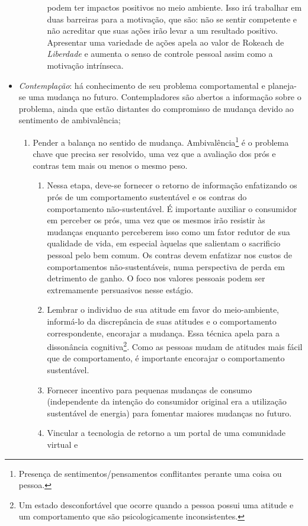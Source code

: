 \begin{itemize}
\begin{enumerate}
\begin{enumerate}
podem ter impactos positivos no meio ambiente. Isso irá trabalhar em duas
barreiras para a motivação, que são: não se sentir competente e não acreditar
que suas ações irão levar a um resultado positivo. Apresentar uma variedade de
ações apela ao valor de Rokeach de \emph{Liberdade} e aumenta o senso de
controle pessoal assim como a motivação intrínseca.
\end{enumerate}
\end{enumerate}
\item \emph{Contemplação}: há conhecimento de seu problema comportamental e
planeja-se uma mudança no futuro. Contempladores são abertos a informação sobre
o problema, ainda que estão distantes do compromisso de mudança devido ao
sentimento de ambivalência;
\begin{enumerate}
\item Pender a balança no sentido de mudança. Ambivalência\footnote{Presença de
sentimentos/pensamentos conflitantes perante uma coisa ou pessoa.} é o problema chave
que precisa ser resolvido, uma vez que a avaliação dos prós e contras tem mais
ou menos o mesmo peso.
\begin{enumerate}
\item Nessa etapa, deve-se fornecer o retorno de informação enfatizando os prós de um
comportamento sustentável e os contras do comportamento não-sustentável. É
importante auxiliar o consumidor em perceber os prós, uma vez que os mesmos irão
resistir às mudanças enquanto perceberem isso como um fator redutor de sua
qualidade de vida, em especial àquelas que salientam o sacrificio pessoal pelo
bem comum. Os contras devem enfatizar nos custos de comportamentos
não-sustentáveis, numa perspectiva de perda em detrimento de ganho. O foco nos
valores pessoais podem ser extremamente persuasivos nesse estágio.
\item Lembrar o individuo de sua atitude em favor do meio-ambiente, informá-lo
da discrepância de suas atitudes e o comportamento correspondente, encorajar a
mudança. Essa técnica apela para a dissonância cognitiva\footnote{Um estado
desconfortável que ocorre quando a pessoa possui uma atitude e um comportamento
que são psicologicamente inconsistentes.}. Como as pessoas mudam de atitudes mais
fácil que de comportamento, é importante encorajar o comportamento sustentável.
\item Fornecer incentivo para pequenas mudanças de consumo (independente da
intenção do consumidor original era a utilização sustentável de energia) para
fomentar maiores mudanças no futuro.
\item Vincular a tecnologia de retorno a um portal de uma comunidade virtual e

\end{enumerate}
\end{enumerate}
\end{itemize}
